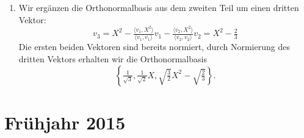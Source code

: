 \begin{enumerate}
	\item Wir ergänzen die Orthonormalbasis aus dem zweiten Teil um einen dritten Vektor:
	\begin{equation*}
		v_3 = X^2-\tfrac{\langle v_1,X^2 \rangle}{\langle v_1,v_1 \rangle}v_1 - \tfrac{\langle v_2,X^2 \rangle}{\langle v_2,v_2 \rangle}v_2 = X^2-\tfrac{2}{3}
	\end{equation*}
	Die ersten beiden Vektoren sind bereits normiert, durch Normierung des dritten Vektors erhalten wir die Orthonormalbasis
	\begin{equation*}
		\left\{ \tfrac{1}{\sqrt{3}},\tfrac{1}{\sqrt{2}}X,\sqrt{\tfrac{3}{2}}X^2-\sqrt{\tfrac{2}{3}} \right\}\text{.}
	\end{equation*}
\end{enumerate}

\newpage

\section{Frühjahr 2015}

